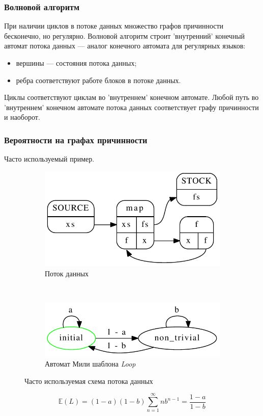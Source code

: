 \documentclass[10pt,pdf,hyperref={unicode}]{beamer}
\begin{document}
\begin{frame}
  \frametitle{Волновой алгоритм}
  При наличии циклов в потоке данных множество графов причинности бесконечно, но регулярно.
  Волновой алгоритм строит 'внутренний' конечный автомат потока данных --- аналог конечного
  автомата для регулярных языков:
  \begin{itemize}
    \item вершины --- состояния потока данных;
    \item ребра соответствуют работе блоков в потоке данных.
  \end{itemize}
  Циклы соответствуют циклам во 'внутреннем' конечном автомате.
  Любой путь во 'внутреннем' конечном автомате потока данных соответствует графу причинности и наоборот.
\end{frame}

\begin{frame}
  \frametitle{Вероятности на графах причинности}
  Часто используемый пример.
  \begin{figure}[H]
  \centering
  \begin{subfigure}[b]{0.45\textwidth}
    \centering
    \includegraphics[width=\textwidth]{example_cg.pdf}
    \caption{Поток данных}
  \end{subfigure}
  ~
  \begin{subfigure}[b]{0.45\textwidth}
    \centering
    \includegraphics[width=\textwidth]{map_fa_prob.pdf}
    \caption{Автомат Мили шаблона \textit{Loop}}
  \end{subfigure}  
  \caption{Часто используемая схема потока данных}
\end{figure}
$$\mathbb{E}(L) = (1 - a) (1 - b) \sum^{\infty}_{n = 1} n b^{n - 1} = \frac{1 - a}{1 - b}$$
\end{frame}
\end{document}
